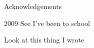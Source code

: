 \begin{frontmatter}
\tableofcontents
\listoffigures  %
\listoftables   %

\begin{acknowledgements}                                                       
Acknowledgements

\end{acknowledgements}                                                         

\begin{vitapage}                                                               
\begin{vita}                                                                   
  \item[2009] See I've been to school
    
\end{vita}                                                                     
\begin{publications}                                                           
\item Look at this thing I wrote


\end{publications}
\end{vitapage}
\end{frontmatter}
